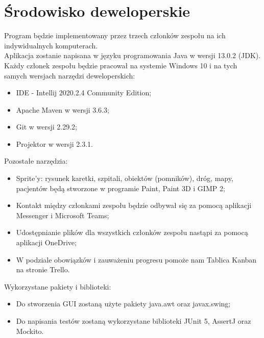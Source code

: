 \documentclass{article}
\begin{document}
\clearpage
{}

\section{Środowisko deweloperskie}
{\fontsize{12}{12}\selectfont
Program będzie implementowany przez trzech członków zespołu na ich indywidualnych komputerach.\\

Aplikacja zostanie napisana w języku programowania Java w wersji 13.0.2 (JDK). \\

Każdy członek zespołu będzie pracował na systemie Windows 10 i na tych samych wersjach narzędzi deweloperskich: 
\begin{itemize}
    \item IDE - Intellij 2020.2.4 Community Edition;
    \item Apache Maven w wersji 3.6.3;
    \item Git w wersji 2.29.2;
    \item Projektor w wersji 2.3.1.
\end{itemize}

Pozostałe narzędzia:

\begin{itemize}
    \item Sprite'y: rysunek karetki, szpitali, obiektów (pomników), dróg, mapy, pacjentów  będą stworzone w programie Paint, Paint 3D i GIMP 2;
    \item Kontakt między członkami zespołu będzie odbywał się za pomocą aplikacji Messenger i Microsoft Teams;
    \item Udostępnianie plików dla wszystkich członków zespołu nastąpi za pomocą aplikacji OneDrive;
    \item W podziale obowiązków i zauważeniu progresu pomoże nam Tablica Kanban na stronie Trello.
\end{itemize}

Wykorzystane pakiety i biblioteki:
\begin{itemize}
    \item Do stworzenia GUI zostaną użyte pakiety java.awt oraz javax.swing;
    \item Do napisania testów zostaną wykorzystane biblioteki JUnit 5, AssertJ oraz Mockito.
\end{itemize}

}

\clearpage
{}
\end{document}
